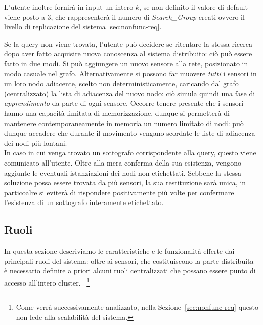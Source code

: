 \documentclass{llncs}
\begin{document}
L'utente inoltre fornirà in input un intero $k$, se non definito il valore di  default 
viene posto a 3, che rappresenterà il numero di  \emph{Search\_Group} creati ovvero il livello
di replicazione del sistema \ref{sec:nonfunc-req}. 

Se la query non viene trovata, l'utente può decidere se ritentare
la stessa ricerca dopo aver fatto acquisire nuova conoscenza al sistema
distribuito: ciò può essere fatto in due modi.
Si può aggiungere un nuovo sensore alla rete, posizionato in modo
casuale nel grafo. Alternativamente
si possono far muovere \emph{tutti} i sensori in un loro nodo adiacente,
scelto non deterministicamente, caricando dal grafo (centralizzato)
la lista di adiacenza del nuovo nodo: ciò simula quindi una fase di
\emph{apprendimento} da parte di ogni sensore. Occorre tenere presente
che i sensori hanno una capacità limitata di memorizzazione,
dunque si permetterà di mantenere contemporaneamente in memoria un
numero limitato di nodi: può dunque accadere che durante il movimento
vengano scordate le liste di adiacenza dei nodi più lontani.
\\

In caso in cui venga trovato un sottografo corrispondente alla query,
questo viene comunicato all'utente.
Oltre alla mera conferma della sua esistenza, vengono aggiunte
le eventuali istanziazioni dei nodi non etichettati.
Sebbene la stessa soluzione possa essere trovata da più sensori,
la sua restituzione sarà unica, in particoalre si eviterà di rispondere
positivamente più volte per confermare l'esistenza di un sottografo
interamente etichettato.\\


\subsection{Ruoli}
In questa sezione descriviamo le caratteristiche e le funzionalità
efferte dai principali ruoli del sistema:
oltre ai sensori, che costituiscono la parte distribuita
è necessario definire a priori alcuni ruoli centralizzati
che possano essere punto di accesso all'intero cluster.%
~\footnote{Come verrà successivamente analizzato,
  nella Sezione~\ref{sec:nonfunc-req} questo non lede alla
  scalabilità del sistema.}
\end{document}
